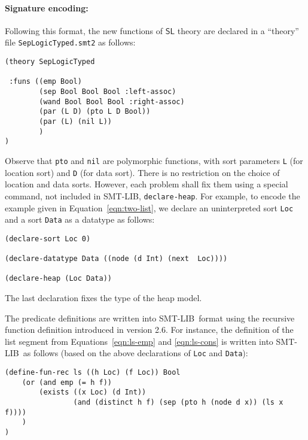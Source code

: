 \documentclass[orivec]{llncs}
\newcommand{\seplog}{\mathsf{SL}}
\newcommand{\smtlib}{\textsf{SMT-LIB}}
\begin{document}
\paragraph{Signature encoding:}
Following this format, the new functions of $\seplog$ theory are declared in
a ``theory'' file \texttt{SepLogicTyped.smt2} as follows:
\begin{Verbatim}
(theory SepLogicTyped

 :funs ((emp Bool)
        (sep Bool Bool Bool :left-assoc)
        (wand Bool Bool Bool :right-assoc)
        (par (L D) (pto L D Bool))
        (par (L) (nil L))
        )
)
\end{Verbatim}
Observe that {\tt pto} and {\tt nil} are polymorphic functions, with
sort parameters {\tt L} (for location sort) and {\tt D} (for data sort). 
There is no restriction on the choice of location and data sorts.
However, each problem shall fix them using a special command,
not included in \smtlib, {\tt declare-heap}.
For example, to encode the example given in Equation~\ref{eqn:two-list},
we declare an uninterpreted sort \texttt{Loc} and 
a sort \texttt{Data} as a datatype as follows:
\begin{Verbatim}
(declare-sort Loc 0)

(declare-datatype Data ((node (d Int) (next  Loc))))

(declare-heap (Loc Data))
\end{Verbatim}
The last declaration fixes the type of the heap model.

The predicate definitions are written into \smtlib\ format using the recursive
function definition introduced in version 2.6. For instance, the definition 
of the list segment from Equations~\ref{eqn:ls-emp} and \ref{eqn:ls-cons} is
written into \smtlib\ as follows (based on the above declarations of 
\texttt{Loc} and \texttt{Data}):
\begin{Verbatim}
(define-fun-rec ls ((h Loc) (f Loc)) Bool
    (or (and emp (= h f))
        (exists ((x Loc) (d Int)) 
                (and (distinct h f) (sep (pto h (node d x)) (ls x f))))
    )
)
\end{Verbatim}
\end{document}
